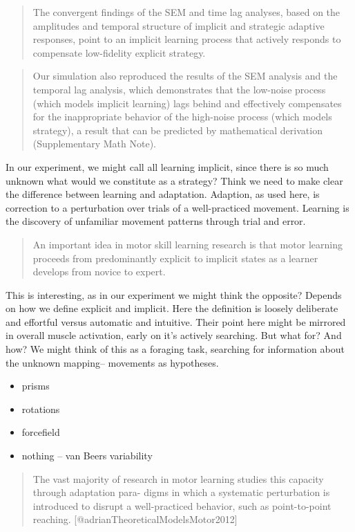 \documentclass[../main.tex]{subfiles}
\begin{document}
{{{{{{{{{{{\begin{quote}
The convergent findings of the SEM and time lag analyses, based on the
amplitudes and temporal structure of implicit and strategic adaptive
responses, point to an implicit learning process that actively responds
to compensate low-fidelity explicit strategy.
\end{quote}

\begin{quote}
Our simulation also reproduced the results of the SEM analysis and the
temporal lag analysis, which demonstrates that the low-noise process
(which models implicit learning) lags behind and effectively compensates
for the inappropriate behavior of the high-noise process (which models
strategy), a result that can be predicted by mathematical derivation
(Supplementary Math Note).
\end{quote}

In our experiment, we might call all learning implicit, since there is
so much unknown what would we constitute as a strategy? Think we need to
make clear the difference between learning and adaptation. Adaption, as
used here, is correction to a perturbation over trials of a
well-practiced movement. Learning is the discovery of unfamiliar
movement patterns through trial and error.

\begin{quote}
An important idea in motor skill learning research is that motor
learning proceeds from predominantly explicit to implicit states as a
learner develops from novice to expert.
\end{quote}

This is interesting, as in our experiment we might think the opposite?
Depends on how we define explicit and implicit. Here the definition is
loosely deliberate and effortful versus automatic and intuitive. Their
point here might be mirrored in overall muscle activation, early on it's
actively searching. But what for? And how? We might think of this as a
foraging task, searching for information about the unknown mapping--
movements as hypotheses.

\begin{itemize}
\tightlist
\item
  prisms
\item
  rotations
\item
  forcefield
\item
  nothing -- van Beers variability
\end{itemize}

\begin{quote}
The vast majority of research in motor learning studies this capacity
through adaptation para- digms in which a systematic perturbation is
introduced to disrupt a well-practiced behavior, such as point-to-point
reaching. {[}@adrianTheoreticalModelsMotor2012{]}
\end{quote}

}}}}}}}}}}}
\end{document}
